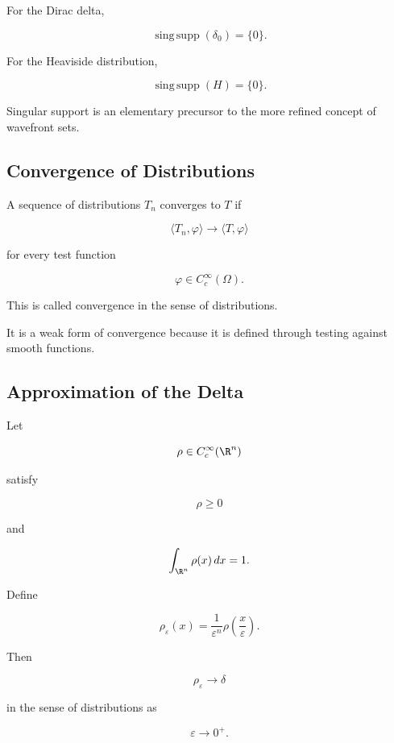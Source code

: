 For the Dirac delta,

\[
\boxed{
\operatorname{sing\,supp}(\delta_0)
=
\{0\}.
}
\]

For the Heaviside distribution,

\[
\boxed{
\operatorname{sing\,supp}(H)
=
\{0\}.
}
\]

Singular support is an elementary precursor to the more refined concept
of wavefront sets.

\subsection{Convergence of Distributions}
\label{subsec:distribution-convergence}

A sequence of distributions \(T_n\) converges to \(T\) if

\[
\boxed{
\langle T_n,\varphi\rangle
\to
\langle T,\varphi\rangle
}
\]

for every test function

\[
\varphi\in C_c^\infty(\Omega).
\]

This is called convergence in the sense of distributions.

It is a weak form of convergence because it is defined through testing
against smooth functions.

\subsection{Approximation of the Delta}
\label{subsec:approximation-delta}

Let

\[
\rho\in C_c^\infty(\R^n)
\]

satisfy

\[
\rho\geq0
\]

and

\[
\int_{\R^n}\rho(x)\,dx=1.
\]

Define

\[
\boxed{
\rho_\varepsilon(x)
=
\frac{1}{\varepsilon^n}
\rho\left(\frac{x}{\varepsilon}\right).
}
\]

Then

\[
\boxed{
\rho_\varepsilon
\to
\delta
}
\]

in the sense of distributions as

\[
\varepsilon\to0^+.
\]


